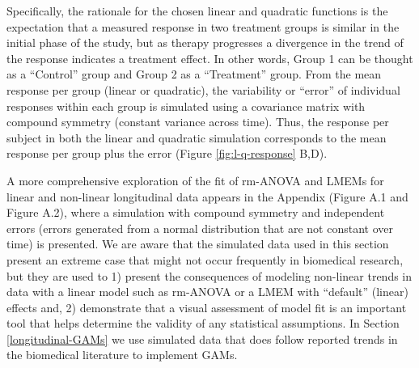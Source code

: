 \documentclass[
]{article}
\begin{document}
Specifically, the rationale for the chosen linear and quadratic functions is the expectation that a measured response in two treatment groups is similar in the initial phase of the study, but as therapy progresses a divergence in the trend of the response indicates a treatment effect. In other words, Group 1 can be thought as a ``Control'' group and Group 2 as a ``Treatment'' group. From the mean response per group (linear or quadratic), the variability or ``error'' of individual responses within each group is simulated using a covariance matrix with compound symmetry (constant variance across time). Thus, the response per subject in both the linear and quadratic simulation corresponds to the mean response per group plus the error (Figure \ref{fig:l-q-response} B,D).

A more comprehensive exploration of the fit of rm-ANOVA and LMEMs for linear and non-linear longitudinal data appears in the Appendix (Figure A.1 and Figure A.2), where a simulation with compound symmetry and independent errors (errors generated from a normal distribution that are not constant over time) is presented. We are aware that the simulated data used in this section present an extreme case that might not occur frequently in biomedical research, but they are used to 1) present the consequences of modeling non-linear trends in data with a linear model such as rm-ANOVA or a LMEM with ``default'' (linear) effects and, 2) demonstrate that a visual assessment of model fit is an important tool that helps determine the validity of any statistical assumptions. In Section \ref{longitudinal-GAMs} we use simulated data that does follow reported trends in the biomedical literature to implement GAMs.
\end{document}
